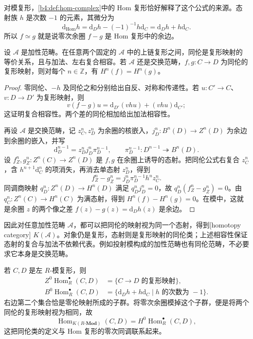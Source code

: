 \ProseParagraphBreak
对模复形，\cref{b4:def:hom-complex}中的 Hom 复形恰好解释了这个公式的来源。态射族 \(h\) 是次数 \(-1\) 的元素，其微分为
\[
	\mathrm{d}_{\operatorname{Hom}}h =\mathrm{d}_Dh-(-1)^{-1}h\mathrm{d}_C =\mathrm{d}_Dh+h\mathrm{d}_C.
\]
所以 \(f\simeq g\) 就是说零次余圈 \(f-g\) 是 Hom 复形中的余边。

\begin{proposition}\label{b4:prop:homotopy-cohomology}
	设 \(\mathcal A\) 是加性范畴。在任意两个固定的 \(\mathcal A\) 中的上链复形之间，同伦是复形映射的等价关系，且与加法、左右复合相容。若 \(\mathcal A\) 还是交换范畴，\(f,g:C\to D\) 为同伦的复形映射，则对每个 \(n\in\mathbb Z\)，有 \(H^n(f)=H^n(g)\)。
\end{proposition}
\begin{proof}
	零同伦、\(-h\) 及同伦之和分别给出自反、对称和传递性。若 \(u:C'\to C\)、\(v:D\to D'\) 为复形映射，则
	\[
		v(f-g)u=\mathrm{d}_{D'}(vhu)+(vhu)\mathrm{d}_{C'};
	\]
	这证明复合相容性。两个差的同伦相加给出加法相容性。

	再设 \(\mathcal A\) 是交换范畴，记 \(z_C^n,z_D^n\) 为余圈的核嵌入，\(j_D^n:B^n(D)\to Z^n(D)\) 为余边到余圈的嵌入，并写
	\[
		\mathrm{d}_D^{n-1}=z_D^nj_D^n\pi_D^{n-1}, \qquad \pi_D^{n-1}:D^{n-1}\twoheadrightarrow B^n(D).
	\]
	设 \(f_Z^n,g_Z^n:Z^n(C)\to Z^n(D)\) 是 \(f,g\) 在余圈上诱导的态射。把同伦公式右复合 \(z_C^n\)，含 \(h^{n+1}\mathrm{d}_C^n\) 的项消失，再消去单态射 \(z_D^n\)，得到
	\[
		f_Z^n-g_Z^n=j_D^n\pi_D^{n-1}h^nz_C^n.
	\]
	同调商映射 \(q_D^n:Z^n(D)\to H^n(D)\) 满足 \(q_D^nj_D^n=0\)，故 \(q_D^n(f_Z^n-g_Z^n)=0\)。由 \(q_C^n:Z^n(C)\to H^n(C)\) 为满态射，得到 \(H^n(f)-H^n(g)=0\)。在模中，这就是余圈 \(z\) 的两个像之差 \(f(z)-g(z)=\mathrm{d}_Dh(z)\) 是余边。
\end{proof}

因此对任意加性范畴 \(\mathcal A\)，都可以把同伦的映射视为同一个态射，得到[homotopy category] \(K(\mathcal A)\)。对象仍是复形，态射则是复形映射的同伦类；上述相容性保证态射的复合与加法不依赖代表。例如投射模构成的加性范畴也有同伦范畴，不必要求它本身是交换范畴。

\ProseParagraphBreak
若 \(C,D\) 是左 \(R\)-模复形，则
\[
	\begin{aligned}
		Z^0\operatorname{Hom}_R^\bullet(C,D) &=\{C\to D\text{ 的复形映射}\},\\
		B^0\operatorname{Hom}_R^\bullet(C,D) &=\{\mathrm{d}_Dh+h\mathrm{d}_C\mid h\text{ 的次数为 }-1\}.
	\end{aligned}
\]
右边第二个集合恰是零伦映射所成的子群。将零次余圈模掉这个子群，便是将两个同伦的复形映射视为相同，故
\[
	\operatorname{Hom}_{K(R\text{-}\mathbf{Mod})}(C,D) =H^0\operatorname{Hom}_R^\bullet(C,D),
\]
这把同伦类的定义与 Hom 复形的零次同调联系起来。

